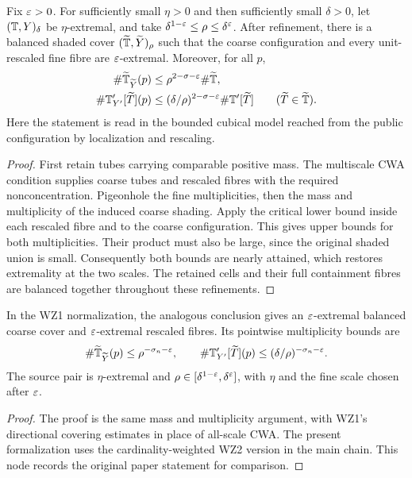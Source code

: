 \begin{proposition}
\label{prop:sticky-structure}
\leanok
{}
Fix $\varepsilon>0$. For sufficiently small $\eta>0$ and then sufficiently
small $\delta>0$, let $(\mathbb{T},Y)_\delta$ be $\eta$-extremal, and take
$\delta^{1-\varepsilon}\leq\rho\leq\delta^\varepsilon$. After refinement, there
is a balanced shaded cover $(\widetilde{\mathbb{T}},\widetilde Y)_\rho$ such
that the coarse configuration and every unit-rescaled fine fibre are
$\varepsilon$-extremal. Moreover, for all $p$,
\begin{align*}
 \#\widetilde{\mathbb{T}}_{\widetilde Y}(p)
   &\leq\rho^{2-\sigma-\varepsilon}\#\widetilde{\mathbb{T}},\\
 \#\mathbb{T}'_{Y'}[\widetilde T](p)
   &\leq(\delta/\rho)^{2-\sigma-\varepsilon}\#\mathbb{T}'[\widetilde T]
       \qquad(\widetilde T\in\widetilde{\mathbb{T}}).
\end{align*}
Here the statement is read in the bounded cubical model reached from
the public configuration by localization and rescaling.
\end{proposition}
\begin{proof}
\leanok
First retain tubes carrying comparable positive mass. The multiscale
CWA condition supplies coarse tubes and rescaled fibres with the
required nonconcentration. Pigeonhole the fine multiplicities, then
the mass and multiplicity of the induced coarse shading. Apply the
critical lower bound inside each rescaled fibre and to the coarse
configuration. This gives upper bounds for both multiplicities. Their
product must also be large, since the original shaded union is small.
Consequently both bounds are nearly attained, which restores
extremality at the two scales. The retained cells and their full
containment fibres are balanced together throughout these refinements.
\end{proof}

\begin{proposition}
\label{prop:wz1-sticky}
In the WZ1 normalization, the analogous conclusion gives an
$\varepsilon$-extremal balanced coarse cover and $\varepsilon$-extremal rescaled
fibres. Its pointwise multiplicity bounds are
\[
 \#\widetilde{\mathbb{T}}_{\widetilde Y}(p)\leq\rho^{-\sigma_n-\varepsilon},
 \qquad
 \#\mathbb{T}'_{Y'}[\widetilde T](p)
       \leq(\delta/\rho)^{-\sigma_n-\varepsilon}.
\]
The source pair is $\eta$-extremal and
$\rho\in[\delta^{1-\varepsilon},\delta^\varepsilon]$, with $\eta$ and the fine
scale chosen after $\varepsilon$.
\end{proposition}
\begin{proof}
The proof is the same mass and multiplicity argument, with WZ1's
directional covering estimates in place of all-scale CWA. The present
formalization uses the cardinality-weighted WZ2 version in the main
chain. This node records the original paper statement for comparison.
\end{proof}


